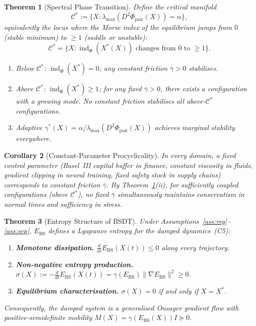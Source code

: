 \documentclass[11pt,a4paper]{article}
\newcommand{\Ebs}{E_{\mathrm{BS}}}
\newcommand{\Cman}{\mathcal{C}^*}
\newcommand{\Xst}{X^*}
\newcommand{\lmax}{\lambda_{\max}}
\newcommand{\ddt}{\tfrac{d}{dt}}
\newcommand{\grad}{\nabla}
\newcommand{\norm}[1]{\|#1\|}
\DeclareMathOperator{\ind}{ind}
\newtheorem{theorem}{Theorem}
\newtheorem{corollary}[theorem]{Corollary}
\begin{document}
\begin{theorem}[Spectral Phase Transition]\label{thm:phase}
Define the critical manifold
\begin{equation}\label{eq:cman}
  \Cman := \bigl\{X : \lmax(D^2\Phi_{\mathrm{pair}}(X)) = \alpha\bigr\},
\end{equation}
equivalently the locus where the Morse index of the equilibrium
jumps from $0$ (stable minimum) to $\ge 1$ (saddle or unstable):
\begin{equation}\label{eq:cman_morse}
  \Cman = \bigl\{X : \ind_\Phi(\Xst(X)) \text{ changes from }
  0 \text{ to } \ge 1\bigr\}.
\end{equation}
\begin{enumerate}[nosep]
  \item Below $\Cman$: $\ind_\Phi(\Xst)=0$; any constant friction
    $\bar{\gamma}>0$ stabilises.
  \item Above $\Cman$: $\ind_\Phi(\Xst)\ge 1$; for any fixed
    $\bar{\gamma}>0$, there exists a configuration with a growing
    mode.  No constant friction stabilises all above-$\Cman$
    configurations.
  \item Adaptive $\gamma^*(X) = \alpha / \lmax(D^2\Phi_{\mathrm{pair}}(X))$
    achieves marginal stability everywhere.
\end{enumerate}
\end{theorem}

\begin{corollary}[Constant-Parameter Procyclicality]\label{cor:procyclical}
In every domain, a fixed control parameter (Basel~III capital
buffer in finance, constant viscosity in fluids, gradient clipping
in neural training, fixed safety stock in supply chains) corresponds
to constant friction $\bar{\gamma}$.  By
Theorem~\ref{thm:phase}(ii), for sufficiently coupled configurations
(above $\Cman$), no fixed $\bar{\gamma}$ simultaneously maintains
conservatism in normal times and sufficiency in stress.
\end{corollary}

\begin{theorem}[Entropy Structure of BSDT]\label{thm:entropy}
Under Assumptions~\ref{ass:reg}--\ref{ass:sep}, $\Ebs$ defines a
Lyapunov entropy for the damped dynamics~(C5):
\begin{enumerate}[nosep]
  \item[\textup{(E1)}] \textbf{Monotone dissipation.}
    $\ddt\Ebs(X(t))\le 0$ along every trajectory.
  \item[\textup{(E2)}] \textbf{Non-negative entropy production.}
    $\sigma(X):=-\ddt\Ebs(X(t))=\gamma(\Ebs)\norm{\grad\Ebs}^2\ge 0$.
  \item[\textup{(E3)}] \textbf{Equilibrium characterisation.}
    $\sigma(X)=0$ if and only if $X=\Xst$.
\end{enumerate}
Consequently, the damped system is a generalised \emph{Onsager
gradient flow} with positive-semidefinite mobility
$M(X)=\gamma(\Ebs(X))I\succeq 0$.
\end{theorem}
\end{document}

